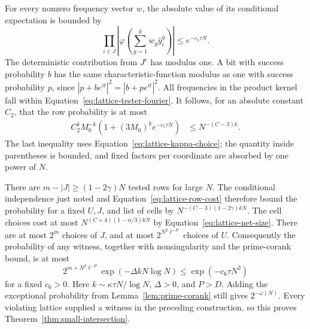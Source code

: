 For every nonzero frequency vector $w$, the absolute value of its
conditional expectation is bounded by
\[
 \prod_{i\in J}
 \left|\varphi\left(\sum_{g=1}^k w_g\widehat y_i^g\right)\right|
 \le e^{-c_5\tau N}.
\]
The deterministic contribution from $J^c$ has modulus one.  A bit
with success probability $b$ has the same characteristic-function
modulus as one with success probability $p$, since
$|p+b e^{it}|^2=|b+p e^{it}|^2$.
All frequencies in the product kernel fall within
Equation~\eqref{eq:lattice-tester-fourier}.
It follows, for an absolute constant $C_2$, that the row probability
is at most
\begin{align}
 C_2^kM_0^{-k}\left(1+(3M_0)^k e^{-c_5\tau N}\right)
 &\le N^{-(C-3)k}.
 \label{eq:lattice-row-cost}
\end{align}
The last inequality uses Equation~\eqref{eq:lattice-kappa-choice};
the quantity inside parentheses is bounded, and fixed factors per
coordinate are absorbed by one power of $N$.

There are $m-|J|\ge(1-2\gamma)N$ tested rows for large $N$.
The conditional independence just noted and
Equation~\eqref{eq:lattice-row-cost} therefore bound the probability
for a fixed $U,J$, and list of cells by
$N^{-(C-3)(1-2\gamma)kN}$.
The cell choices cost at most
$N^{(C+4)(1-\alpha/3)kN}$ by Equation~\eqref{eq:lattice-net-size}.
There are at most $2^m$ choices of $J$, and at most
$2^{N^2\ell^{-P}}$ choices of $U$.
Consequently the probability of any witness, together with
nonsingularity and the prime-corank bound, is at most
\[
 2^{m+N^2\ell^{-P}}
       \exp(-\Delta kN\log N)
 \le \exp(-c_6\tau N^2)
\]
for a fixed $c_6>0$.  Here $k\sim\kappa\tau N/\log N$,
$\Delta>0$, and $P>D$.
Adding the exceptional probability from
Lemma~\ref{lem:prime-corank} still gives $2^{-\omega(N)}$.
Every violating lattice supplied a witness in the preceding
construction, so this proves Theorem~\ref{thm:small-intersection}.
